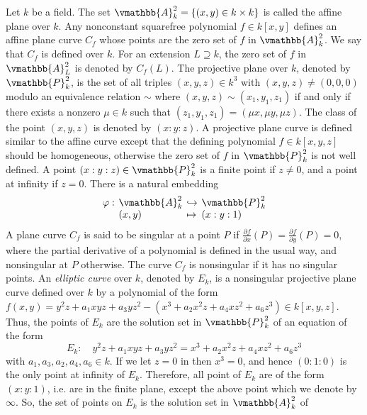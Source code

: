 Let $k$ be a field. The set $\vmathbb{A}_{k}^2 = \{ (x, y) \in k \times k \}$ is called the affine 
plane over $k$. Any nonconstant squarefree polynomial $f \in k[x,y]$ defines an affine plane curve 
$C_f$ whose points are the zero set of $f$ in $\vmathbb{A}_k^2$. We say that $C_f$ is defined over 
$k$. For an extension $L \supseteq k$, the zero set of $f$ in $\vmathbb{A}_L^2$ is denoted by 
$C_f(L)$. The projective plane over $k$, denoted by $\vmathbb{P}_k^2$, is the set of all triples $(x, 
y, z) \in k^3$ with $(x, y, z) \ne (0, 0, 0)$ modulo an equivalence relation $\sim$ where $(x, y, z) 
\sim (x_1, y_1, z_1)$ if and only if there exists a nonzero $\mu \in k$ such that $(z_1, y_1, z_1) = 
(\mu x, \mu y, \mu z)$. The class of the point $(x, y, z)$ is denoted by $(x: y: z)$. A projective 
plane curve is defined similar to the affine curve except that the defining polynomial $f \in k[x, 
y, z]$ should be homogeneous, otherwise the zero set of $f$ in $\vmathbb{P}_k^2$ is not well defined. 
A point $(x: y: z) \in \vmathbb{P}_k^2$ is a finite point if $z \ne 0$, and a point at infinity if $z 
= 0$. There is a natural embedding
$$
\setlength\arraycolsep{2pt}
\begin{array}{llll}
\varphi: & \vmathbb{A}_k^2 & \hookrightarrow & \vmathbb{P}_k^2 \\
 & (x, y) & \mapsto & (x: y: 1)
\end{array}
$$
A plane curve $C_f$ is said to be singular at a point $P$ if $\frac{\partial f}{\partial x}(P) = 
\frac{\partial f}{\partial y}(P) = 0$, where the partial derivative of a polynomial is defined in 
the usual way, and nonsingular at $P$ otherwise. The curve $C_f$ is nonsingular if it has no 
singular points. An \emph{elliptic curve} over $k$, denoted by $E_k$, is a nonsingular projective 
plane curve defined over $k$ by a polynomial of the form $f(x, y) = y^2z + a_1xyz + a_3yz^2 - (x^3 + 
a_2x^2z + a_4xz^2 + a_6z^3) \in k[x, y, z]$. Thus, the points of $E_k$ are the solution set in 
$\vmathbb{P}_k^2$ of an equation of the form
\begin{equation}
\label{equation:PEC}
E_k: \quad y^2z + a_1xyz + a_3yz^2 = x^3 + a_2x^2z + a_4xz^2 + a_6z^3
\end{equation}
with $a_1, a_3, a_2, a_4, a_6 \in k$. If we let $z = 0$ in  then $x^3 = 
0$, and hence $(0: 1: 0)$ is the only point at infinity of $E_k$. Therefore, all point of $E_k$ are 
of the form $(x: y: 1)$, i.e. are in the finite plane, except the above point which we denote by 
$\infty$. So, the set of points on $E_k$ is the solution set in $\vmathbb{A}_k^2$ of 
